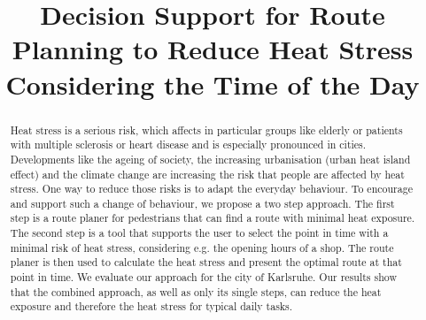 \documentclass[a4paper,parskip=half]{scrartcl}
\title{Decision Support for Route Planning to Reduce Heat Stress Considering the Time of the Day}
\author{}
\begin{document}
\maketitle

\begin{abstract}
	Heat stress is a serious risk, which affects in particular  groups like elderly or patients with multiple sclerosis or heart disease and is especially pronounced in cities. Developments like the ageing of society, the increasing urbanisation (urban heat island effect) and the climate change are increasing the risk that people are affected by heat stress. One way to reduce those risks is to adapt the everyday behaviour. 
To encourage and support such a change of behaviour, we propose a two step approach. The first step is a route planer for pedestrians that can find a route with minimal heat exposure. The second step is a tool that supports the user to select the point in time with a minimal risk of heat stress, considering e.g. the opening hours of a shop. The route planer is then used to calculate the heat stress and present the optimal route at that point in time.
We evaluate our approach for the city of Karlsruhe. 	
Our results show that the combined approach, as well as only its single steps, can reduce the heat exposure and therefore the heat stress for typical daily tasks.
\end{abstract}





%


\printbibliography
\end{document}
